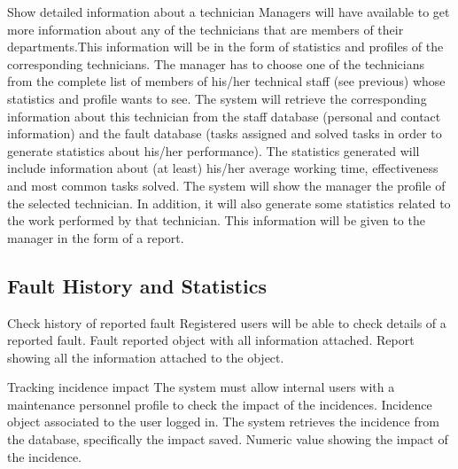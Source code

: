 \begin{requirement}{Show detailed information about a technician}
\reqdesc Managers will have available to get more information about any of the technicians that are members of their departments.This information will be in the form of statistics and profiles of the corresponding technicians.
\reqin The manager has to choose one of the technicians from the complete list of members of his/her technical staff (see previous) whose statistics and profile wants to see.
\reqsteps The system will retrieve the corresponding information about this technician from the staff database (personal and contact information) and the fault database (tasks assigned and solved tasks in order to generate statistics about his/her performance). The statistics generated will include information about (at least) his/her average working time, effectiveness and most common tasks solved.
\reqout The system will show the manager the profile of the selected technician. In addition, it will also generate some statistics related to the work performed by that technician. This information will be given to the manager in the form of a report.
\end{requirement}


\subsection{Fault History and Statistics}

\begin{requirement}{Check history of reported fault}
\reqdesc Registered users will be able to check details of a reported fault.
\reqin Fault reported object with all information attached.
\reqout Report showing all the information attached to the object.
\end{requirement}

\begin{requirement}{Tracking incidence impact}
\reqdesc The system must allow internal users with a maintenance personnel profile to check the impact of the incidences.
\reqin Incidence object associated to the user logged in.
\reqsteps The system retrieves the incidence from the database, specifically the impact saved.
\reqout Numeric value showing the impact of the incidence.
\end{requirement}

